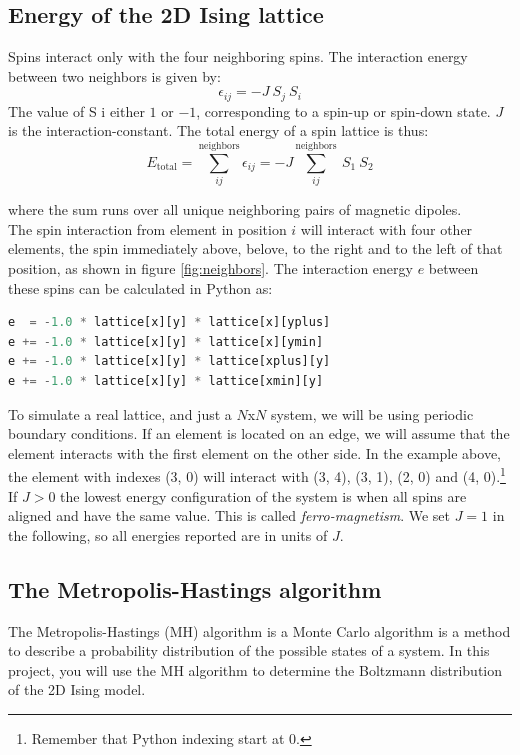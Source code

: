 \documentclass{article}
\begin{document}
\subsection{Energy of the 2D Ising lattice}
\label{section:energy}
Spins interact only with the four neighboring spins. The interaction energy between two neighbors is given by:
\begin{equation}
\epsilon_{ij} = -J \ S_j \ S_i
\end{equation} 
The value of S i either $1$ or $-1$, corresponding to a spin-up or spin-down state. $J$ is the interaction-constant.
The total energy of a spin lattice is thus:
\begin{equation}
E_{\mathrm{total}}=\sum^{\mathrm{neighbors}}_{ij} \epsilon_{ij} = -J \sum^{\mathrm{neighbors}}_{ij} \ S_1 \ S_2
\end{equation}

where the sum runs over all unique neighboring pairs of magnetic dipoles.\\

The spin interaction from element in position $i$ will interact with four other elements,
the spin immediately above,
belove, to the right and to the left of that position,
as shown in figure \ref{fig:neighbors}.
The interaction energy $e$ between these spins can be calculated in Python as:
\begin{lstlisting}[language=python]
e  = -1.0 * lattice[x][y] * lattice[x][yplus]
e += -1.0 * lattice[x][y] * lattice[x][ymin]
e += -1.0 * lattice[x][y] * lattice[xplus][y]
e += -1.0 * lattice[x][y] * lattice[xmin][y]
\end{lstlisting}


To simulate a real lattice, and just a $N$x$N$ system, we will be using
periodic boundary conditions.
If an element is located on an edge,
we will assume that the element interacts with the first element on the other side.
In the example above, the element with
indexes (3, 0) will interact with (3, 4), (3, 1), (2, 0) and (4, 0).\footnote{Remember that Python
indexing start at 0.}\\

If $J > 0$ the lowest energy configuration of the system is when all spins are
aligned and have the same value.
This is called \textit{ferro-magnetism}.
We set $J = 1$ in the following, so all energies reported are in units of $J$.

\subsection{The Metropolis-Hastings algorithm}
The Metropolis-Hastings (MH) algorithm is a Monte Carlo algorithm is a method
to describe a probability distribution of the possible states of a system.
In this project, you will use the MH algorithm to determine the Boltzmann
distribution of the 2D Ising model.\\
\end{document}

